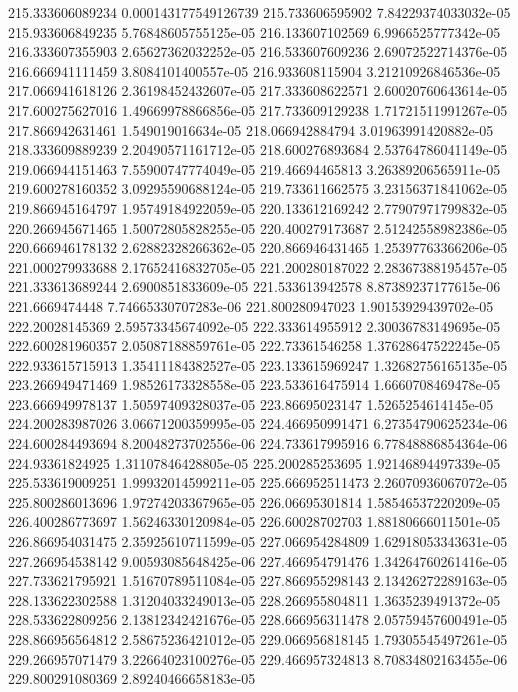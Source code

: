 {215.333606089234 0.000143177549126739
215.733606595902 7.84229374033032e-05
215.933606849235 5.76848605755125e-05
216.133607102569 6.9966525777342e-05
216.333607355903 2.65627362032252e-05
216.533607609236 2.69072522714376e-05
216.666941111459 3.8084101400557e-05
216.933608115904 3.21210926846536e-05
217.066941618126 2.36198452432607e-05
217.333608622571 2.60020760643614e-05
217.600275627016 1.49669978866856e-05
217.733609129238 1.71721511991267e-05
217.866942631461 1.549019016634e-05
218.066942884794 3.01963991420882e-05
218.333609889239 2.20490571161712e-05
218.600276893684 2.53764786041149e-05
219.066944151463 7.55900747774049e-05
219.46694465813 3.26389206565911e-05
219.600278160352 3.09295590688124e-05
219.733611662575 3.23156371841062e-05
219.866945164797 1.95749184922059e-05
220.133612169242 2.77907971799832e-05
220.266945671465 1.50072805828255e-05
220.400279173687 2.51242558982386e-05
220.666946178132 2.62882328266362e-05
220.866946431465 1.25397763366206e-05
221.000279933688 2.17652416832705e-05
221.200280187022 2.28367388195457e-05
221.333613689244 2.6900851833609e-05
221.533613942578 8.87389237177615e-06
221.6669474448 7.74665330707283e-06
221.800280947023 1.90153929439702e-05
222.20028145369 2.59573345674092e-05
222.333614955912 2.30036783149695e-05
222.600281960357 2.05087188859761e-05
222.73361546258 1.37628647522245e-05
222.933615715913 1.35411184382527e-05
223.133615969247 1.32682756165135e-05
223.266949471469 1.98526173328558e-05
223.533616475914 1.6660708469478e-05
223.666949978137 1.50597409328037e-05
223.86695023147 1.5265254614145e-05
224.200283987026 3.06671200359995e-05
224.466950991471 6.27354790625234e-06
224.600284493694 8.20048273702556e-06
224.733617995916 6.77848886854364e-06
224.93361824925 1.31107846428805e-05
225.200285253695 1.92146894497339e-05
225.533619009251 1.99932014599211e-05
225.666952511473 2.26070936067072e-05
225.800286013696 1.97274203367965e-05
226.06695301814 1.58546537220209e-05
226.400286773697 1.56246330120984e-05
226.60028702703 1.88180666011501e-05
226.866954031475 2.35925610711599e-05
227.066954284809 1.62918053343631e-05
227.266954538142 9.00593085648425e-06
227.466954791476 1.34264760261416e-05
227.733621795921 1.51670789511084e-05
227.866955298143 2.13426272289163e-05
228.133622302588 1.31204033249013e-05
228.266955804811 1.3635239491372e-05
228.533622809256 2.13812342421676e-05
228.666956311478 2.05759457600491e-05
228.866956564812 2.58675236421012e-05
229.066956818145 1.79305545497261e-05
229.266957071479 3.22664023100276e-05
229.466957324813 8.70834802163455e-06
229.800291080369 2.89240466658183e-05
}
